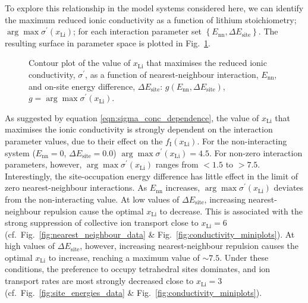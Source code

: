 \documentclass[aps,prb,twocolumn,superscriptaddress,reprint]{revtex4-1}
\newcommand{\set}[1]{\left\{#1\right\}}
\newcommand{\xLi}{x_\m{Li}}
\newcommand{\m}[1]{\mathrm{#1}}
\begin{document}
To explore this relationship in the model systems considered here, we can identify the maximum reduced ionic conductivity as a function of lithium stoichiometry; $\arg\max \sigma^\prime(\xLi)$; for each interaction parameter set $\set{E_\m{nn}, \Delta E_\m{site}}$. The resulting surface in parameter space is plotted in Fig.\ \ref{fig:max_sigma}.
\begin{figure}[tb]
  \centering
    \caption{\label{fig:max_sigma}Contour plot of the value of $\xLi$ that maximises the reduced ionic conductivity, $\sigma^\prime$, as a function of nearest-neighbour interaction, $E_\m{nn}$, and on-site energy difference, $\Delta E_\m{site}$: $g(E_\m{nn}, \Delta E_\m{site})$, $g = \arg \max \sigma^\prime(\xLi)$.}
\end{figure}
As suggested by equation \ref{eqn:sigma_conc_dependence}, the value of $\xLi$ that maximises the ionic conductivity is strongly dependent on the interaction parameter values, due to their effect on the $f_\m{I}(\xLi)$. For the non-interacting system ($E_\m{nn}=0$, $\Delta E_\m{site}=0.0$) $\arg \max \sigma^\prime(\xLi)=4.5$. For non-zero interaction parameters, however, $\arg \max \sigma^\prime(\xLi)$ ranges from $<1.5$ to $>7.5$. Interestingly, the site-occupation energy difference has little effect in the limit of zero nearest-neighbour interactions. As $E_\m{nn}$ increases, $\arg \max \sigma^\prime(\xLi)$ deviates from the non-interacting value. At low values of $\Delta E_\m{site}$, increasing nearest-neighbour repulsion cause the optimal $\xLi$ to decrease. This is associated with the strong suppression of collective ion transport close to $\xLi=6$ (cf.\ Fig.~\ref{fig:nearest_neighbour_data} \& Fig.~\ref{fig:conductivity_miniplots}). At high values of $\Delta E_\m{site}$, however, increasing nearest-neighbour repulsion causes the optimal $\xLi$ to increase, reaching a maximum value of $\sim7.5$. Under these conditions, the preference to occupy tetrahedral sites dominates, and ion transport rates are most strongly decreased close to $\xLi=3$ (cf.\ Fig.~\ref{fig:site_energies_data} \& Fig.~\ref{fig:conductivity_miniplots}).
\end{document}
